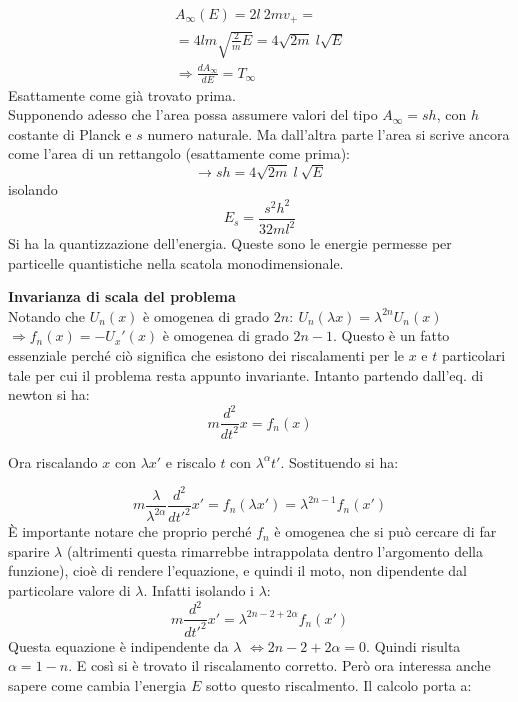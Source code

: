 \documentclass[Main.tex]{subfiles}
\begin{document}
\begin{appendic}
\begin{gather}
	A_\infty (E) = 2l \ 2m v_+=\\
	= 4 lm \sqrt{\frac{2}{m}E} = 4 \sqrt{2m} \ l \sqrt{E}\\
	\Rightarrow \frac{dA_\infty}{dE} = T_\infty
\end{gather}
Esattamente come già trovato prima.\\
	Supponendo adesso che l'area possa assumere valori del tipo $A_\infty = sh$, con $h$ costante di Planck e $s$ numero naturale. Ma dall'altra parte l'area si scrive ancora come l'area di un rettangolo (esattamente come prima):
\begin{equation}
  	\rightarrow sh = 4 \sqrt{2m} \ l \ \sqrt{E}
\end{equation}
	isolando
\begin{equation}
  	E_s = \frac{s^2 h ^2}{32 m l^2}
\end{equation}
Si ha la quantizzazione dell'energia. Queste sono le energie permesse per particelle quantistiche nella scatola monodimensionale. \bigskip 

\noindent 
\textbf{Invarianza di scala del problema}
\\
Notando che $U_n(x)$ è omogenea di grado $2n: \ U_n (\lambda x) = \lambda ^{2n} U_n (x)$
\\$
\Rightarrow f_n(x) = - U_x'(x)
$ è omogenea di grado $2n-1$. Questo è un fatto essenziale perché ciò significa che esistono dei riscalamenti per le $x$ e $t$ particolari tale per cui il problema resta appunto invariante. Intanto partendo dall'eq. di newton si ha:
\begin{equation}
  m \frac{d^2}{dt^2} x = f_n(x)
\end{equation}

Ora riscalando $x$ con $\lambda x'$ e riscalo $t$ con $\lambda^\alpha t'$. Sostituendo si ha:

\begin{equation}
  m \frac{\lambda}{\lambda^{2\alpha}}\frac{d^2}{dt'^2} x' = f_n (\lambda x') = \lambda ^{2n-1} f_n(x')
\end{equation}
È importante notare che proprio perché $f_n$ è omogenea che si può cercare di far sparire $\lambda$ (altrimenti questa rimarrebbe intrappolata dentro l'argomento della funzione), cioè di rendere l'equazione, e quindi il moto, non dipendente dal particolare valore di $\lambda$. Infatti isolando i $\lambda$:
\begin{equation}
  m \frac{d^2}{dt'^2}x' = \lambda^{2n-2+2 \alpha} f_n (x')
\end{equation}
Questa equazione è indipendente da $\lambda$ $\iff 2n-2 + 2 \alpha =0$. Quindi risulta $\alpha = 1-n$. E così si è trovato il riscalamento corretto. Però ora interessa anche sapere come cambia l'energia $E$ sotto questo riscalmento. Il calcolo porta a:


\end{appendic}
\end{document}
